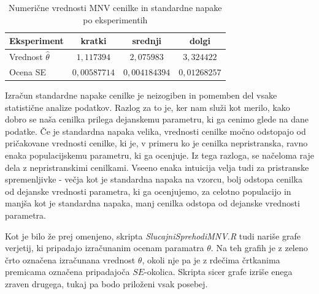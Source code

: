\documentclass[a4paper, 10pt]{article}
\begin{document}
	\begin{table}[h!]
		\label{tab: mnvse}
		\centering
		\begin{tabular}{|l|c|c|c|}
			\hline
			Eksperiment & kratki & srednji & dolgi \\ \hline
			Vrednost $\widehat{\theta}$ & $1{,}117394$ & $2{,}075983$ & $3{,}324422$ \\ \hline
			Ocena SE & $0{,}00587714$ & $0{,}004184394$ & $0{,}01268257$ \\ \hline
		\end{tabular}
		\caption{Numerične vrednosti MNV cenilke in standardne napake po eksperimentih}
	\end{table}
	
	Izračun standardne napake cenilke je neizogiben in pomemben del vsake statistične analize podatkov. Razlog za to je, ker nam služi kot merilo, kako dobro se naša cenilka prilega dejanskemu parametru, ki ga cenimo glede na dane podatke. Če je standardna napaka velika, vrednosti cenilke močno odstopajo od pričakovane vrednosti cenilke, ki je, v primeru ko je cenilka nepristranska, ravno enaka populacijskemu parametru, ki ga ocenjuje. Iz tega razloga, se načeloma raje dela z nepristranskimi cenilkami. Vseeno enaka intuicija velja tudi za pristranske spremenljivke - večja kot je standardna napaka na vzorcu, bolj odstopa cenilka od dejanske vrednosti parametra, ki ga ocenjujemo, za celotno populacijo in manjša kot je standardna napaka, manj cenilka odstopa od dejanske vrednosti parametra.
	
	Kot je bilo že prej omenjeno, skripta \textit{SlucajniSprehodiMNV.R} tudi nariše grafe verjetij, ki pripadajo izračunanim ocenam paramatra $\theta$. Na teh grafih je z zeleno črto označena izračunana vrednost $\theta$, okoli nje pa je z rdečima črtkanima premicama označena pripadajoča $SE$-okolica. Skripta sicer grafe izriše enega zraven drugega, tukaj pa bodo priloženi vsak posebej.
	
\end{document}
